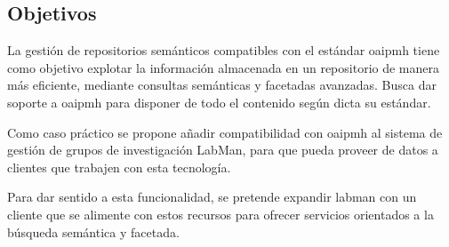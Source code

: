 \subsection{Objetivos}

La gestión de repositorios semánticos compatibles con el estándar \acrshort{oaipmh} tiene como objetivo explotar la información almacenada en un repositorio de manera más eficiente, mediante consultas semánticas y facetadas avanzadas. Busca dar soporte a \acrshort{oaipmh} para disponer de todo el contenido según dicta su estándar.

Como caso práctico se propone añadir compatibilidad con \acrshort{oaipmh} al sistema de gestión de grupos de investigación LabMan, para que pueda proveer de datos a clientes que trabajen con esta tecnología.

Para dar sentido a esta funcionalidad, se pretende expandir labman con un cliente que se alimente con estos recursos para ofrecer servicios orientados a la búsqueda semántica y facetada.